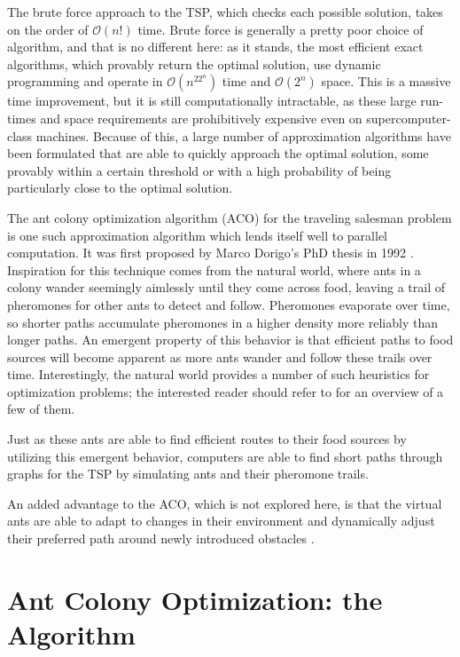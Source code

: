 \documentclass[twocolumn]{article}
\begin{document}
The brute force approach to the TSP, which checks each possible solution, takes 
on the order of $\mathcal{O}(n!)$ time. Brute force is generally a pretty poor choice of
algorithm, and that is no different here: as it stands, the most efficient 
exact algorithms, which provably return the optimal solution, use dynamic
programming and operate in $\mathcal{O}(n^22^n)$ time and $\mathcal{O}(2^n)$ space. 
This is a massive time improvement, but it is still computationally intractable, as 
these large run-times and space requirements are prohibitively expensive even on 
supercomputer-class machines. Because of this, a large number of approximation 
algorithms have been formulated that are able to quickly approach the optimal 
solution, some provably within a certain threshold or with a high probability of
being particularly close to the optimal solution.  

The ant colony optimization algorithm (ACO) for the traveling salesman problem 
is one such approximation algorithm which lends itself well to parallel 
computation. It was first proposed by Marco Dorigo's PhD thesis in 1992 \cite{dorigo}. 
Inspiration for this technique comes from the natural world, where ants in a
colony wander seemingly aimlessly until they come across food, leaving
a trail of pheromones for other ants to detect and follow. Pheromones
evaporate over time, so shorter paths accumulate pheromones in a higher density 
more reliably than longer paths. An emergent property of this behavior is that 
efficient paths to food sources will become apparent as more ants wander and 
follow these trails over time. Interestingly, the natural world provides a number
of such heuristics for optimization problems; the interested reader should 
refer to \cite{nature} for an overview of a few of them. 

Just as these ants are able to find efficient routes to their food sources by
utilizing this emergent behavior, computers are able to find short paths through
graphs for the TSP by simulating ants and their pheromone trails. 

An added advantage to the ACO, which is not explored here, is that
the virtual ants are able to adapt to changes in their environment and 
dynamically adjust their preferred path around newly introduced obstacles 
\cite{iridia:aco}.

\section{Ant Colony Optimization: the Algorithm} \label{sec:aco}
\end{document}
